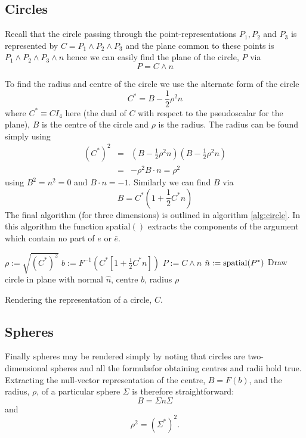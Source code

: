 \subsection{Circles}

Recall that the circle passing through the point-representations $P_1, P_2$ and $P_3$
is represented by $C = P_1 \wedge P_2 \wedge P_3$ and the plane common to these points is
$P_1 \wedge P_2 \wedge P_3 \wedge n$ hence we can easily find the plane of 
the circle, $P$ via
\[
P = C \wedge n
\]

To find the radius and centre of the circle we use the alternate form of the 
circle
\cite{wareham_lasenby}
\[
C^* = B - \frac{1}{2}\rho^2n
\]
where $C^* \equiv CI_4$ here (the dual of $C$ with respect to the pseudoscalar 
for the plane), $B$ is the centre of the circle and $\rho$ is the radius. The
radius can be found simply using
\begin{eqnarray*}
(C^*)^2 & = & \left(B - \frac{1}{2}\rho^2n\right)\left(B - \frac{1}{2}\rho^2n\right) \\
        & = & -\rho^2 B\cdot n = \rho^2
\end{eqnarray*}
using $B^2 = n^2 = 0$ and $B \cdot n = -1$. Similarly we can find $B$ via
\[
B = C^* \left( 1 + \frac{1}{2}C^*n \right)
\]
The final algorithm (for three dimensions) is outlined in algorithm \ref{alg:circle}.
In this algorithm the function spatial$()$ extracts the components of the argument
which contain no part of $e$ or $\bar{e}$.

\begin{fancyalg}
\begin{algorithmic}[1]
\STATE $\rho := \sqrt{(C^*)^2}$
\STATE $b := F^{-1}\left(C^* \left[ 1 + \frac{1}{2}C^*n \right]\right)$
\STATE $P := C \wedge n$
\STATE $\hat{n} := {\rm spatial}(P^*)$
\STATS Draw circle in plane with normal $\hat{n}$, centre $b$, radius $\rho$
\end{algorithmic}
\caption{\label{alg:circle}Rendering the representation of a circle, $C$.}
\end{fancyalg}

\subsection{Spheres}

Finally spheres may be rendered simply by noting that circles are two-dimensional
spheres and all the formul\ae for obtaining centres and radii hold true. Extracting
the null-vector representation of the centre, $B = F(b)$, and the radius, $\rho$,
of a particular sphere $\Sigma$ is therefore straightforward:
\[
B = \Sigma n \Sigma
\]
and
\[
\rho^2 = \left(\Sigma^*\right)^2.
\]
